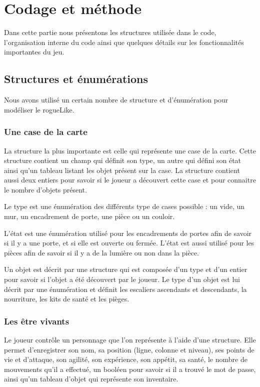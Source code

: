 \documentclass[11pt]{report}
\begin{document}
\chapter{Codage et méthode}

Dans cette partie nous présentons les structures utilisée dans le code, l'organisation interne du code ainsi que quelques détails sur les fonctionnalités importantes du jeu.
	\section{Structures et énumérations}
	
	Nous avons utilisé un certain nombre de structure et d'énumération pour modéliser le rogueLike.
	
		\subsection{Une case de la carte}
	
		La structure la plus importante est celle qui représente une case de la carte. Cette structure contient un champ qui définit son type, un autre qui défini son état ainsi qu'un tableau listant les objet présent sur la case. La structure contient aussi deux entiers pour savoir si le joueur a découvert cette case et pour connaitre le nombre d'objets présent.
	
		Le type est une énumération des différents type de cases possible : un vide, un mur, un encadrement de porte, une pièce ou un couloir.
	
		L'état est une énumération utilisé pour les encadrements de portes afin de savoir si il y a une porte, et si elle est ouverte ou fermée. L'état est aussi utilisé pour les pièces afin de savoir si il y a de la lumière ou non dans la pièce.
	
		Un objet est décrit par une structure qui est composée d'un type et d'un entier pour savoir si l'objet a été découvert par le joueur. Le type d'un objet est lui décrit par une énumération et définit les escaliers ascendants et descendants, la nourriture, les kits de santé et les pièges.
		
		\subsection{Les être vivants}
		
		Le joueur contrôle un personnage que l'on représente à l'aide d'une structure. Elle permet d'enregistrer son nom, sa position (ligne, colonne et niveau), ses points de vie et d'attaque, son agilité, son expérience, son appétit, sa santé, le nombre de mouvements qu'il a effectué, un booléen pour savoir si il a trouvé le mot de passe, ainsi qu'un tableau d'objet qui représente son inventaire.
		
\end{document}
